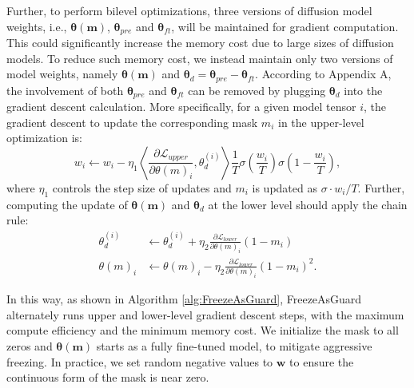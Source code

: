 \documentclass{article}
\begin{document}
Further, to perform bilevel optimizations, three versions of diffusion model weights, i.e.,  $\boldsymbol{\theta}(\mathbf{m})$, $\boldsymbol{\theta}_{pre}$ and $\boldsymbol{\theta}_{ft}$, will be maintained for gradient computation. This could significantly increase the memory cost due to large sizes of diffusion models. To reduce such memory cost, we instead maintain only two versions of model weights, namely $\boldsymbol{\theta}(\mathbf{m})$ and $\boldsymbol{\theta}_{d} = \boldsymbol{\theta}_{pre} - \boldsymbol{\theta}_{ft}$. According to Appendix A, the involvement of both $\boldsymbol{\theta}_{pre}$ and $\boldsymbol{\theta}_{ft}$ can be removed by plugging $\boldsymbol{\theta}_{d}$ into the gradient descent calculation. More specifically, for a given model tensor $i$, the gradient descent to update the corresponding mask $m_i$ in the upper-level optimization is:
\begin{equation}
	w_i \leftarrow w_i - \eta_1 \left< \frac{\partial{\mathcal{L}_{upper}}}{\partial{\theta(m)_i}}, \theta_{d}^{(i)} \right> \frac{1}{T}\sigma\left(\frac{w_i}{T}\right)\sigma\left(1-\frac{w_i}{T}\right),
	\label{eq:upper_gd}
\end{equation}
where $\eta_1$ controls the step size of updates and $m_i$ is updated as $\sigma\cdot w_i/{T}$. Further, computing the update of $\boldsymbol{\theta}(\mathbf{m})$ and $\boldsymbol{\theta}_d$ at the lower level should apply the chain rule:
\begin{align}
	\theta_{d}^{(i)} &\leftarrow \theta_{d}^{(i)} + \eta_2 \frac{\partial \mathcal{L}_{lower}}{\partial \theta(m)_{i}} (1-m_i) \label{eq:lower_gd_1}
	\\
	\theta(m)_i &\leftarrow \theta(m)_i - \eta_2 \frac{\partial \mathcal{L}_{lower}}{\partial \theta(m)_{i}} (1-m_i)^2. \label{eq:lower_gd_2}
\end{align}

In this way, as shown in Algorithm \ref{alg:FreezeAsGuard}, FreezeAsGuard alternately runs upper and lower-level gradient descent steps, with the maximum compute efficiency and the minimum memory cost. We initialize the mask to all zeros and $\boldsymbol{\theta}(\mathbf{m})$ starts as a fully fine-tuned model, to mitigate aggressive freezing. In practice, we set random negative values to $\mathbf{w}$ to ensure the continuous form of the mask is near zero.
\end{document}
